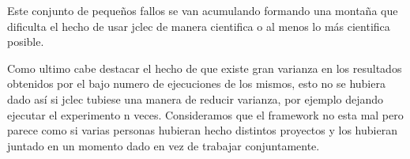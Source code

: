 \documentclass[a4paper,12pt,titlepage]{article}
\begin{document}
Este conjunto de pequeños fallos se van acumulando formando una montaña que dificulta el hecho de usar jclec de manera cientifica o al menos lo más cientifica posible.

Como ultimo cabe destacar el hecho de que existe gran varianza en los resultados obtenidos por el bajo numero de ejecuciones de los mismos, esto no se hubiera dado así si jclec tubiese una manera de reducir varianza, por ejemplo dejando ejecutar el experimento n veces. Consideramos que el framework no esta mal pero parece como si varias personas hubieran hecho distintos proyectos y los hubieran juntado en un momento dado en vez de trabajar conjuntamente.


\newpage


\end{document}
